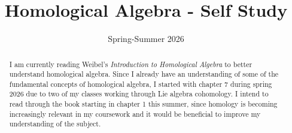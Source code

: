 \documentclass[A4, 11pt]{report}
\title{Homological Algebra - Self Study}
\date{Spring-Summer 2026}
\begin{document}
\maketitle
\tableofcontents

\begin{abstract}
	I am currently reading Weibel's \emph{Introduction to Homological Algebra} to better understand homological algebra. Since I already have an understanding of some of the fundamental concepts of homological algebra, I started with chapter 7 during spring 2026 due to two of my classes working through Lie algebra cohomology. I intend to read through the book starting in chapter 1 this summer, since homology is becoming increasingly relevant in my coursework and it would be beneficial to improve my understanding of the subject. \cite{weibel}
\end{abstract}







\end{document}
